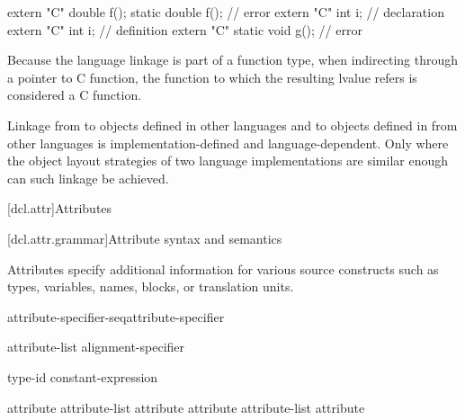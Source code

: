 \begin{codeblock}
extern "C" double f();
static double f();                  // error
extern "C" int i;                   // declaration
extern "C" {
  int i;                            // definition
}
extern "C" static void g();         // error
\end{codeblock}
\exitexample

\pnum
\enternote
Because the language linkage is part of a function type, when
indirecting through a pointer to C function, the function to
which the resulting lvalue refers is considered a C function.
\exitnote

\pnum
{}%
%
Linkage from \Cpp to objects defined in other languages and to objects
defined in \Cpp from other languages is implemen\-tation-defined and
language-dependent. Only where the object layout strategies of two
language implementations are similar enough can such linkage be
achieved.%

[dcl.attr]{Attributes}%

[dcl.attr.grammar]{Attribute syntax and semantics}

\pnum
{}%
Attributes specify additional information for various source constructs
such as types, variables, names, blocks, or translation units.

\begin{bnf}
\br
  attribute-specifier-seq\opt attribute-specifier
\end{bnf}

\begin{bnf}
\br
  \terminal{[} \terminal{[} attribute-list \terminal{]} \terminal{]}\br
  alignment-specifier
\end{bnf}

\begin{bnf}
\br
   type-id \opt \terminal{)}\br
   constant-expression \opt \terminal{)}
\end{bnf}

\begin{bnf}
\br
  attribute\opt\br
  attribute-list \terminal{,} attribute\opt\br
  attribute \br
  attribute-list \terminal{,} attribute 
\end{bnf}

